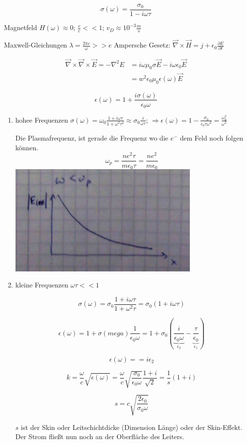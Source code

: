 \[\boxed{\sigma(\omega) = \frac{\sigma_0}{1-i\omega\tau}}\]

Magnetfeld \(H(\omega) \approx 0\); \(\frac{v}{c}<< 1\); \(v_D\approx 10^{-3}\frac{m}{s}\)

Maxwell-Gleichungen \(\lambda = \frac{2\pi c}{\omega}>> e \)
Ampersche Gesetz: \(\vec \nabla \times \vec H = j + \epsilon_0\frac{\partial E}{\partial t}\)

\begin{align}
\vec \nabla \times \vec \nabla \times \vec E = -\nabla^2 E &= i\omega \mu_0\sigma \vec E - i\omega \epsilon_0\vec E\\
&=w^2 \epsilon_0\mu_0\epsilon(\omega) \vec E
\end{align}

\[\epsilon (\omega) = 1+ \frac{i\sigma(\omega)}{\epsilon_0 \omega}\]


\begin{enumerate}
\item hohee Frequenzen \(\sigma(\omega) = \omega_0\frac{1+i\omega\tau}{1+\omega^2\tau^2}\approx\sigma_0\frac{i}{\omega\tau}\); \(\Rightarrow \epsilon(\omega) = 1-\frac{\sigma_0}{\epsilon_0\tau\omega^2}=\frac{\omega^2_0}{\omega^2}\)

Die Plasmafrequenz, ist gerade die Frequenz wo die \(e^-\)  dem Feld noch folgen können. 
\[ \omega_p = \frac{ne^2\tau}{m\epsilon_0 \tau}=\frac{ne^2}{m\epsilon_0}\]
\includegraphics[width=0.75\textwidth]{kap06_21.png}

\item kleine Frequenzen \(\omega\tau << 1\)

\[\sigma (\omega) = \sigma_0 \frac{1+i\omega\tau}{1+\omega^2\tau} =  \sigma_0(1+i\omega\tau)\]

\[ \epsilon(\omega) = 1+\sigma(mega)\frac{1}{\epsilon_0\omega} = 1 + \sigma_0(\underbrace{\frac{i}{\epsilon_0\omega}}_{\epsilon_2}-\underbrace{\frac{\tau}{\epsilon_0}}_{\epsilon_1})\]

\[ \epsilon(\omega) = = i\epsilon_2\]

\[ k = \frac{\omega}{c}\sqrt{\epsilon(\omega)} =  \frac{\omega}{c}\sqrt{\frac{\sigma_0}{\epsilon_0 \omega}}\frac{1+i}{\sqrt 2} = \frac{1}{s}(1+i)\]

\[s = c\sqrt{\frac{2\epsilon_0}{\sigma_0\omega}}\]

\(s\) ist der Skin oder Leitschichtdicke (Dimension Länge) oder der Skin-Effekt. Der Strom fließt nun noch an der Oberfläche des Leiters. 

\end{enumerate}


